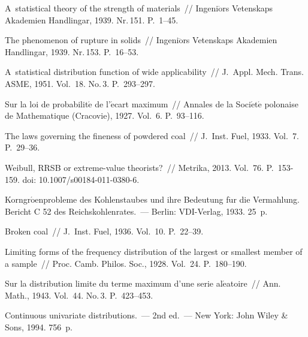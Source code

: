 \begin{multicols}{2}
{\small\frenchspacing
 {%
 \begin{thebibliography}{99}

 A~statistical theory of the strength of
materials~// Ingeni$\ddot{\mbox{o}}$rs Vetenskaps Akademien Handlingar, 1939.
Nr.\,151. P.~1--45.

 The phenomenon of rupture in
solids~// Ingeni$\ddot{\mbox{o}}$rs Vetenskaps Akademien Handlingar, 1939.
Nr.\,153. P.~16--53.

 A~statistical distribution function
of wide applicability~//  J.~Appl. Mech.
Trans. ASME, 1951.
Vol.~18. No.\,3. P.~293--297.

 Sur la loi de
probabilit$\acute{\mbox{e}}$ de l'$\acute{\mbox{e}}$cart maximum~// Annales de la
Soci$\acute{\mbox{e}}$t$\acute{\mbox{e}}$ polonaise de Mathematique (Cracovie), 1927. Vol.~6.
P.~93--116.

 The laws governing the fineness
of powdered coal~// J.~Inst. Fuel, 1933. Vol.~7.
P.~29--36.

 Weibull, RRSB or extreme-value
theorists?~// Metrika, 2013. Vol.~76. P.~153-159. doi: 10.1007/s00184-011-0380-6.

Korngr$\acute{\mbox{o}}${\hspace*{-0.6mm}\ptb{\ss}}enprobleme des Kohlenstaubes und ihre Bedeutung
f$\ddot{\mbox{u}}$r die Vermahlung. Bericht C 52 des Reichskohlenrates.~---
Berlin: VDI-Verlag, 1933. 25~p.

 Broken coal~// J.~Inst. Fuel, 1936. Vol.~10. P.~22--39.

Limiting forms of the frequency distribution of the largest or
smallest member of a sample~// Proc. Camb.
Philos. Soc., 1928. Vol.~24. P.~180--190.

 Sur la distribution limite
du terme maximum d'une serie al$\acute{\mbox{e}}$atoire~// Ann. Math.,
1943. Vol.~44. No.\,3. P.~423--453.

 Continuous
univariate distributions.~--- 2nd ed.~--- New York: John Wiley \& Sons,
1994. 756~p.


\end{thebibliography}}}
\end{multicols}

